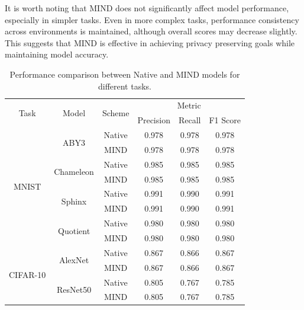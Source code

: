 \documentclass[conference]{IEEEtran}
\begin{document}
It is worth noting that MIND does not significantly affect model performance, especially in simpler tasks. Even in more complex tasks, performance consistency across environments is maintained, although overall scores may decrease slightly. This suggests that MIND is effective in achieving privacy preserving goals while maintaining model accuracy.
\begin{table}[ht]
\centering
\caption{Performance comparison between Native and MIND models for different tasks.}
\begin{tabular}{ c|c|c | c c c } 
\hline
\multirow{2}{*}{Task} & \multirow{2}{*}{Model} & \multirow{2}{*}{Scheme} & \multicolumn{3}{c}{Metric} \\ 
\cline{4-6}
                      &                        &                        & Precision & Recall & F1 Score \\ 
\hline
\multirow{8}{*}{MNIST}   & \multirow{2}{*}{ABY3}      & Native & 0.978 & 0.978 & 0.978\\ 
                      &            & MIND    & 0.978 & 0.978 & 0.978 \\ 
\cline{2-6}
                      & \multirow{2}{*}{Chameleon}   & Native & 0.985&0.985&0.985           \\ 
                      &            & MIND    & 0.985  &0.985 & 0.985   \\ 
\cline{2-6}
                      & \multirow{2}{*}{Sphinx}      & Native  & 0.991 & 0.990 & 0.991 \\ 
                      &            & MIND    & 0.991 & 0.990 & 0.991\\ 
\cline{2-6}
                      & \multirow{2}{*}{Quotient}   & Native  & 0.980 & 0.980 & 0.980 \\ 
                      &            & MIND    & 0.980 & 0.980 & 0.980 \\ 
\hline
\multirow{4}{*}{CIFAR-10} & \multirow{2}{*}{AlexNet}    & Native  &  0.867  & 0.866  & 0.867   \\ 
                      &            & MIND    &  0.867  & 0.866  & 0.867  \\ 
\cline{2-6}
                      & \multirow{2}{*}{ResNet50}    & Native  & 0.805 & 0.767 & 0.785 \\ 
                      &            & MIND    & 0.805 & 0.767 & 0.785\\ 
\cline{2-6}
                    

\end{tabular}
\end{table}
\end{document}
